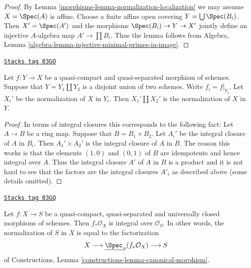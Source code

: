 \begin{proof}

By Lemma \ref{morphisms-lemma-normalization-localization} we may assume $X = \Spec(A)$
is affine. Choose a finite affine open covering $Y = \bigcup \Spec(B_i)$.
Then $X' = \Spec(A')$ and the morphisms $\Spec(B_i) \to Y \to X'$
jointly define an injective $A$-algebra map $A' \to \prod B_i$.
Thus the lemma follows from
Algebra, Lemma \ref{algebra-lemma-injective-minimal-primes-in-image}.
\end{proof}

\begin{lemma}
\label{morphisms-lemma-normalization-in-disjoint-union}
\href{https://stacks.math.columbia.edu/tag/03GO}{\texttt{Stacks tag 03GO}}

Let $f : Y \to X$ be a quasi-compact and quasi-separated morphism of schemes.
Suppose that $Y = Y_1 \amalg Y_2$ is a disjoint union of two schemes.
Write $f_i = f|_{Y_i}$. Let $X_i'$ be the normalization of $X$ in $Y_i$.
Then $X_1' \amalg X_2'$ is the normalization of $X$ in $Y$.
\end{lemma}

\begin{proof}
In terms of integral closures this corresponds to the following fact:
Let $A \to B$ be a ring map. Suppose that $B = B_1 \times B_2$.
Let $A_i'$ be the integral closure of $A$ in $B_i$. Then
$A_1' \times A_2'$ is the integral closure of $A$ in $B$.
The reason this works is that the elements $(1, 0)$ and $(0, 1)$ of $B$
are idempotents and hence integral over $A$. Thus the integral closure
$A'$ of $A$ in $B$ is a product and it is not hard to see that the factors
are the integral closures $A'_i$ as described above (some details
omitted).
\end{proof}

\begin{lemma}
\label{morphisms-lemma-normalization-in-universally-closed}
\href{https://stacks.math.columbia.edu/tag/03GQ}{\texttt{Stacks tag 03GQ}}

Let $f : X \to S$ be a quasi-compact, quasi-separated and
universally closed morphisms of schemes.
Then $f_*\mathcal{O}_X$ is integral over $\mathcal{O}_S$. In other
words, the normalization of $S$ in $X$ is equal to the factorization
$$
X \longrightarrow \underline{\Spec}_S(f_*\mathcal{O}_X)
\longrightarrow S
$$
of Constructions, Lemma \ref{constructions-lemma-canonical-morphism}.
\end{lemma}

